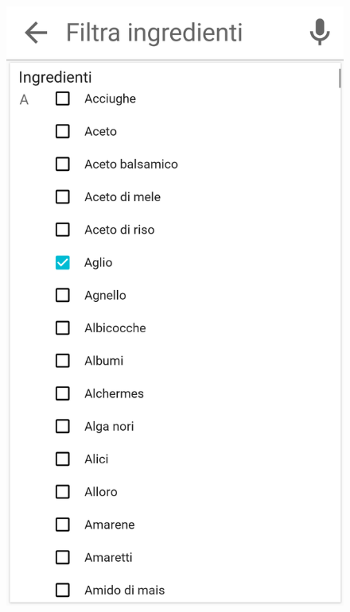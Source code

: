 \begin{figure}[H]
\begin{minipage}{.49\textwidth}
		\includegraphics[width=\textwidth]{img/wireframe/search_page_esclusione.png}
	\end{minipage}
\end{figure}